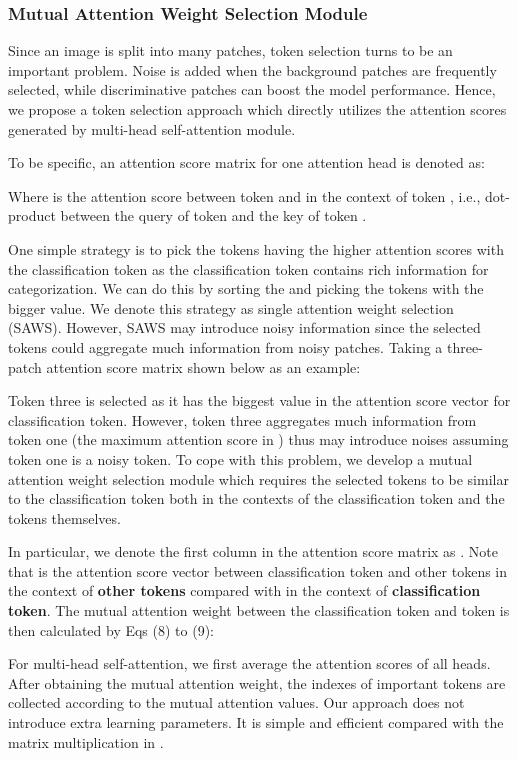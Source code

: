 \documentclass{bmvc2k}
\begin{document}
\subsubsection{Mutual Attention Weight Selection Module}
Since an image is split into many patches, token selection turns to be an important problem. Noise is added when the background patches are frequently selected, while discriminative patches can boost the model performance. Hence, we propose a token selection approach which directly utilizes the attention scores generated by multi-head self-attention module.
\par
To be specific, an attention score matrix for one attention head  is denoted as:


Where  is the attention score between token  and  in the context of token , i.e., dot-product between the query of token  and the key of token .
\par
One simple strategy is to pick the tokens having the higher attention scores with the classification token as the classification token contains rich information for categorization. We can do this by sorting the  and picking the  tokens with the bigger value. We denote this strategy as single attention weight selection (SAWS). However, SAWS may introduce noisy information since the selected tokens could aggregate much information from noisy patches. Taking a three-patch attention score matrix  shown below as an example:

\par
Token three is selected as it has the biggest value in the attention score vector for classification token. However, token three aggregates much information from token one (the maximum attention score in ) thus may introduce noises assuming token one is a noisy token. To cope with this problem, we develop a mutual attention weight selection module which requires the selected tokens to be similar to the classification token both in the contexts of the classification token and the tokens themselves.
\par
In particular, we denote the first column in the attention score matrix as . Note that  is the attention score vector between classification token and other tokens in the context of \textbf{other tokens} compared with  in the context of \textbf{classification token}. The mutual attention weight  between the classification token and token  is then calculated by Eqs (8) to (9):


\par
For multi-head self-attention, we first average the attention scores of all heads. After obtaining the mutual attention weight, the indexes of important tokens are collected according to the mutual attention values. Our approach does not introduce extra learning parameters. It is simple and efficient compared with the matrix multiplication in \cite{he2021transfg}.
\end{document}
